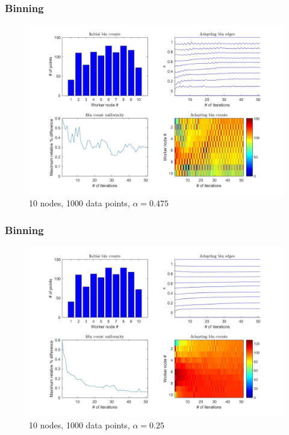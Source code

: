 \documentclass{beamer}
\begin{document}
\begin{frame}
	\frametitle{Binning}
	
	\begin{figure}[!htb]
		\centering
		\vspace{-5pt}
		\includegraphics[scale = 0.25]{AdaptiveBinning_10Nodes_1000Lines_0475alpha}
		\vspace{-10pt}
		\caption{10 nodes, 1000 data points, $\alpha = 0.475$}
	\end{figure}
\end{frame}

\begin{frame}
	\frametitle{Binning}
	
	\begin{figure}[!htb]
		\centering
		\vspace{-5pt}
		\includegraphics[scale = 0.25]{AdaptiveBinning_10Nodes_1000Lines_0250alpha}
		\vspace{-10pt}
		\caption{10 nodes, 1000 data points, $\alpha = 0.25$}
	\end{figure}
\end{frame}
\end{document}
